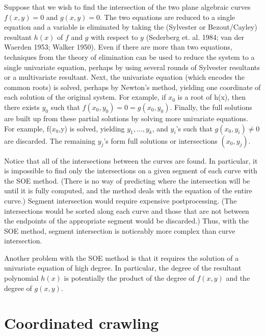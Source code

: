 \begin{example}
Suppose that we wish to find the intersection of the two plane algebraic curves 
$f(x,y)=0$ and $g(x,y)=0$.
The two equations are reduced to a single equation and a variable is eliminated
by taking the (Sylvester or Bezout/Cayley) resultant $h(x)$ of $f$ and $g$ 
with respect to $y$ (Sederberg et. al. 1984; van der Waerden 1953; Walker 1950).
Even if there are more than two equations, techniques from the theory of elimination
can be used to reduce the system to a single univariate equation, perhaps by using several
rounds of Sylvester resultants or a multivariate resultant.
Next, the univariate equation (which encodes the common roots) is solved, 
perhaps by Newton's method, yielding one coordinate of each solution of the original 
system.
For example, if $x_{0}$ is a root of h(x),
then there exists $y_{0}$ such that $f(x_{0},y_{0})=0=g(x_{0},y_{0})$.
Finally, the full solutions are built up from these partial solutions
by solving more univariate equations.
For example, f($x_{0}$,y) is solved, yielding $y_{1},\ldots,y_{k}$,
and $y_{i}$'s such that $g(x_{0},y_{i}) \neq 0$ are discarded.
The remaining $y_{j}$'s form full solutions or intersections $(x_{0},y_{j})$.
\end{example}

Notice that all of the intersections between the curves are found.
In particular, it is impossible to find only the intersections on a given segment of each curve 
with the SOE method.
(There is no way of predicting where the intersection will be until it is fully computed, and
the method deals with the equation of the entire curve.)
Segment intersection would require expensive postprocessing. 
(The intersections would be sorted along each curve and those that are not between the endpoints
of the appropriate segment would be discarded.)
Thus, with the SOE method, segment intersection is noticeably more complex than curve
intersection.

Another problem with the SOE method is that it requires the solution of a univariate equation
of high degree.
In particular, the degree of the resultant polynomial $h(x)$ is potentially
the product of the degree of $f(x,y)$ and the degree of $g(x,y)$.

\section{Coordinated crawling}
\label{sec-coor}

